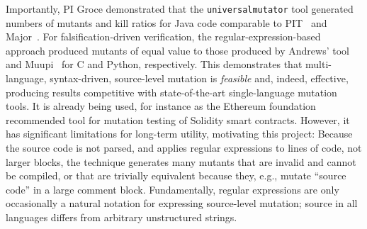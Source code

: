 
Importantly,  PI Groce demonstrated that the {\tt universalmutator} tool generated
numbers of mutants and kill ratios for Java code comparable to
PIT~\cite{pittest} and Major~\cite{Major}.  For falsification-driven
verification, the regular-expression-based approach produced mutants of equal
value to those produced by Andrews' tool~\cite{mutant} and Muupi~\cite{muupi}
for C and Python, respectively.
This demonstrates that multi-language, syntax-driven, source-level mutation is
\emph{feasible} and, indeed, effective, producing results competitive with
state-of-the-art single-language mutation tools.  It is already being
used, for instance as the Ethereum foundation recommended tool for mutation testing of
Solidity smart contracts.
However, it has significant limitations for long-term utility,
motivating this project: Because the source
code is not parsed, and applies regular expressions to lines of code, not
larger blocks, the technique generates many mutants that are invalid
and cannot be compiled, or that are trivially equivalent because they, e.g.,
mutate ``source code'' in a large comment block.
Fundamentally, regular expressions are
only occasionally a natural notation for expressing source-level mutation;
source in all languages differs from arbitrary unstructured strings.

